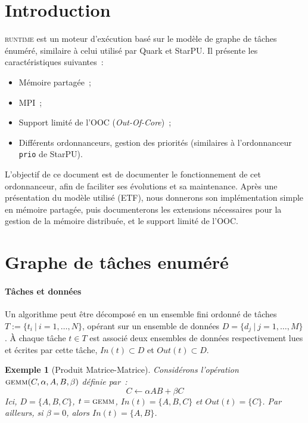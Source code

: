 \documentclass[11pt]{article}
\theoremstyle{plain} %
\newtheorem{example}[thm]{Exemple}
\theoremstyle{definition} %
\begin{document}
\section{Introduction}
\label{sec:introduction}
\textsc{runtime} est un moteur d'exécution basé sur le modèle de graphe de tâches énuméré, similaire à celui utilisé par Quark et StarPU.
Il présente les caractéristiques suivantes~:~
\begin{itemize}
\item Mémoire partagée~;
\item MPI~;
\item Support limité de l'OOC (\emph{Out-Of-Core})~;
\item Différents ordonnanceurs, gestion des priorités (similaires à l'ordonnanceur \texttt{prio} de StarPU).
\end{itemize}

L'objectif de ce document est de documenter le fonctionnement de cet ordonnanceur, afin de faciliter ses évolutions et sa maintenance.
Après une présentation du modèle utilisé (ETF), nous donnerons son implémentation simple en mémoire partagée, puis documenterons les extensions nécessaires pour la gestion de la mémoire distribuée, et le support limité de l'OOC.


\section{Graphe de tâches enuméré}
\label{sec:graphe-de-taches}

\paragraph{Tâches et données}
\label{sec:taches-et-donnees}
Un algorithme peut être décomposé en un ensemble fini ordonné de tâches $T := \{t_i \ | \ i = 1, \dots, N \}$, opérant sur un ensemble de données $D = \{ d_j \ | \ j = 1,\dots, M\}$.
À chaque tâche $t \in T$ est associé deux ensembles de données respectivement lues et écrites par cette tâche, $In(t) \subset D$ et $Out(t) \subset D$.

\begin{example}[Produit Matrice-Matrice]
  \label{ex:gemm}
  Considérons l'opération $\textsc{gemm}(C, \alpha, A, B, \beta)$ définie par~:~
  \begin{equation*}
    C \gets \alpha A B + \beta C
  \end{equation*}
  Ici, $D = \{A, B, C \}$, $t = \textsc{gemm}$, $In(t) = \{A, B, C\}$ et $Out(t) = \{C\}$.
  Par ailleurs, si $\beta = 0$, alors $In(t) = \{A, B\}$.
\end{example}
\end{document}
